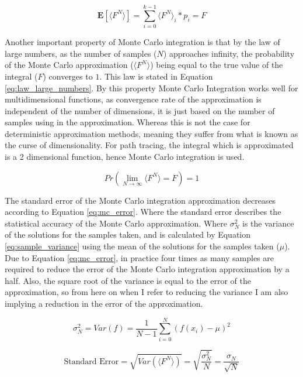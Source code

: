 \documentclass[ %
                    author={Callum Pearce},
                supervisor={Dr. Neill Campbell},
                    degree={MEng},
                     title={How effective are Temporal difference learning methods for reducing the number of zero contribution light paths, while still accurately approximating Global Illumination in Path tracing?},
                  subtitle={},
                      type={research},
                      year={2019} ]{dissertation}
\begin{document}
\begin{equation}
\label{eq:unbiased}
\mathbf{E}[\langle F^N \rangle] = \sum_{i = 0}^{k-1} \langle F^N \rangle_i * p_i =  F
\end{equation}

Another important property of Monte Carlo integration is that by the law of large numbers, as the number of samples ($N$) approaches infinity, the probability of the Monte Carlo approximation ($\langle F^N \rangle$) being equal to the true value of the integral ($F$) converges to $1$. This law is stated in Equation \ref{eq:law_large_numbers}. By this property Monte Carlo Integration works well for multidimensional functions, as convergence rate of the approximation is independent of the number of dimensions, it is just based on the number of samples using in the approximation. Whereas this is not the case for deterministic approximation methods, meaning they  suffer from what is known as the curse of dimensionality. For path tracing, the integral which is approximated is a 2 dimensional function, hence Monte Carlo integration is used. 

\begin{equation}
\label{eq:law_large_numbers}
Pr( \lim_{N \rightarrow \infty} \langle F^N \rangle = F ) = 1
\end{equation}

The standard error of the Monte Carlo integration approximation decreases according to Equation \ref{eq:mc_error}. Where the standard error describes the statistical accuracy of the Monte Carlo approximation. Where $\sigma_N^2$ is the variance of the solutions for the samples  taken, and is calculated by Equation \ref{eq:sample_variance} using the mean of the solutions for the samples taken ($\mu$). Due to Equation \ref{eq:mc_error}, in practice four times as many samples are required to reduce the error of the Monte Carlo integration approximation by a half. Also, the square root of the variance  is equal to the error of the approximation, so from here on when I refer to reducing the variance I am also implying a reduction in the error of the approximation.

\begin{equation}
\label{eq:sample_variance}
\sigma_N^2 = Var(f) = \frac{1}{N-1} \sum_{i=0}^N (f(x_i) - \mu)^2
\end{equation}

\begin{equation}
\label{eq:mc_error}
\text{Standard Error} = \sqrt{Var(\langle F^N \rangle)} = \sqrt{\frac{\sigma_N^2}{N}} = \frac{\sigma_N}{\sqrt{N}}
\end{equation}
\end{document}
